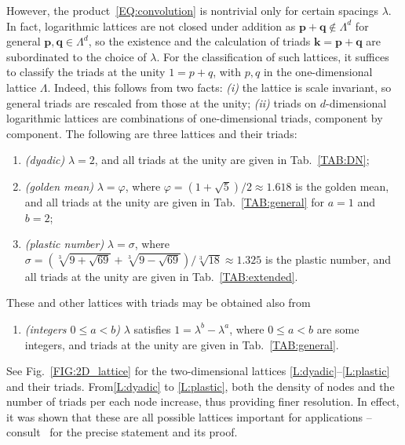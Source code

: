 \documentclass[12pt]{article}
\theoremstyle{definition}
\begin{document}
	However, the product~\eqref{EQ:convolution} is nontrivial only for certain spacings $\lambda$.
	In fact, logarithmic lattices are not closed under addition as $\mathbf{p} + \mathbf{q} \notin \mathbb{\Lambda}^d$ for general $\mathbf{p},\mathbf{q} \in \mathbb{\Lambda}^d$, so the existence and the calculation of triads $\mathbf{k} = \mathbf{p} + \mathbf{q}$ are subordinated to the choice of $\lambda$.
	For the classification of such lattices, it suffices to classify the triads at the unity $1 = p + q$, with $p,q$ in the one-dimensional lattice $\mathbb{\Lambda}$.
	Indeed, this follows from two facts:
	\textit{(i)} the lattice is scale invariant, so general triads are rescaled from those at the unity;
	\textit{(ii)} triads on $d$-dimensional logarithmic lattices are combinations of one-dimensional triads, component by component.
	The following are three lattices and their triads:
	\begin{enumerate}[label=\textit{(L.\arabic*)}] %
		\item \textit{(dyadic)} $\lambda = 2$, and all triads at the unity are given in Tab.~\ref{TAB:DN};
		\label{L:dyadic}
		\item \textit{(golden mean)} $\lambda = \varphi$, where $\varphi = (1+\sqrt{5})/2 \approx 1.618$ is the golden mean, and all triads at the unity are given in Tab.~\ref{TAB:general} for $a = 1$ and $b=2$;
		\label{L:golden}
		\item \textit{(plastic number)} $\lambda = \sigma$, where $\sigma = (\sqrt[3]{9+\sqrt{69}}+\sqrt[3]{9-\sqrt{69}})/\sqrt[3]{18} \approx 1.325$ is the plastic number, and all triads at the unity are given in Tab.~\ref{TAB:extended}.
		\label{L:plastic}
	\end{enumerate}
	These and other lattices with triads may be obtained also from
	\begin{enumerate}[label=\textit{(L.4)}] %
		\item \textit{(integers $0\leq a < b$)} $\lambda$ satisfies $1 = \lambda^b - \lambda^a$, where $0 \leq a < b$ are some integers, and triads at the unity are given in Tab.~\ref{TAB:general}.
		\label{L:general}
	\end{enumerate}
	See Fig.~\ref{FIG:2D_lattice} for the two-dimensional lattices \ref{L:dyadic}--\ref{L:plastic} and their triads.
	From\ref{L:dyadic} to \ref{L:plastic}, both the density of nodes and the number of triads per each node increase, thus providing finer resolution.
	In effect, it was shown that these are all possible lattices important for applications -- consult~\cite{campolina2021fluid} for the precise statement and its proof.
	
\end{document}
